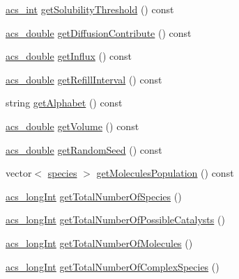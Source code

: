 \begin{DoxyCompactItemize}
\item 
\hyperlink{acs__headers_8h_a8d277355641a098190360234e2ebde35}{acs\-\_\-int} \hyperlink{classenvironment_a6df38337d38f2f714be7058a2a31202c}{get\-Solubility\-Threshold} () const 
\item 
\hyperlink{acs__headers_8h_ab776853a005fcbf56af0424a2a4dd607}{acs\-\_\-double} \hyperlink{classenvironment_a46193e153bd5dcc37fb35346cb7fd971}{get\-Diffusion\-Contribute} () const 
\item 
\hyperlink{acs__headers_8h_ab776853a005fcbf56af0424a2a4dd607}{acs\-\_\-double} \hyperlink{classenvironment_a6f0b4481779cd12dbcd8155916c7d703}{get\-Influx} () const 
\item 
\hyperlink{acs__headers_8h_ab776853a005fcbf56af0424a2a4dd607}{acs\-\_\-double} \hyperlink{classenvironment_a469a7ce80a1e9e5fae77b46b66dfee18}{get\-Refill\-Interval} () const 
\item 
string \hyperlink{classenvironment_add8478cfc878c3aa5a57b2a71357a088}{get\-Alphabet} () const 
\item 
\hyperlink{acs__headers_8h_ab776853a005fcbf56af0424a2a4dd607}{acs\-\_\-double} \hyperlink{classenvironment_a355b53cbc86aaab2a6d114980162ac0e}{get\-Volume} () const 
\item 
\hyperlink{acs__headers_8h_ab776853a005fcbf56af0424a2a4dd607}{acs\-\_\-double} \hyperlink{classenvironment_ab6952f7f6fd971ece0a8661733cfc2b3}{get\-Random\-Seed} () const 
\item 
vector$<$ \hyperlink{classspecies}{species} $>$ \hyperlink{classenvironment_adb12eb52af74ea1fdfe0cd195109fe83}{get\-Molecules\-Population} () const 
\item 
\hyperlink{acs__headers_8h_a19319d75f02db4308bc5c0026d98cd85}{acs\-\_\-long\-Int} \hyperlink{classenvironment_a7a321296874fa1320da225cdbbf56a64}{get\-Total\-Number\-Of\-Species} ()
\item 
\hyperlink{acs__headers_8h_a19319d75f02db4308bc5c0026d98cd85}{acs\-\_\-long\-Int} \hyperlink{classenvironment_a8796aead7bcc4a3f91eec7bc908dfa5b}{get\-Total\-Number\-Of\-Possible\-Catalysts} ()
\item 
\hyperlink{acs__headers_8h_a19319d75f02db4308bc5c0026d98cd85}{acs\-\_\-long\-Int} \hyperlink{classenvironment_a57e7ac49955f4717096cb6696ee03a61}{get\-Total\-Number\-Of\-Molecules} ()
\item 
\hyperlink{acs__headers_8h_a19319d75f02db4308bc5c0026d98cd85}{acs\-\_\-long\-Int} \hyperlink{classenvironment_a453d88017912e8b5973310ea2b044266}{get\-Total\-Number\-Of\-Complex\-Species} ()
\item 

\end{DoxyCompactItemize}
